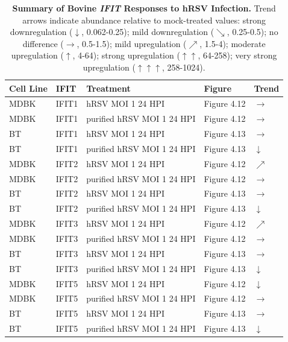 \begin{table}
    \centering
    \begin{tabular}{lllll}
    \hline
		\textbf{Cell Line} & \textbf{IFIT} & \textbf{Treatment} & \textbf{Figure} & \textbf{Trend} \\ \hline
        MDBK & IFIT1 & hRSV MOI 1 24 HPI & Figure 4.12 & \(\rightarrow\) \\ 
        MDBK & IFIT1 & purified hRSV MOI 1 24 HPI & Figure 4.12 & \(\rightarrow\) \\ 
        BT & IFIT1 & hRSV MOI 1 24 HPI & Figure 4.13 & \(\rightarrow\) \\ 
        BT & IFIT1 & purified hRSV MOI 1 24 HPI & Figure 4.13 & \(\downarrow\) \\ 
        MDBK & IFIT2 & hRSV MOI 1 24 HPI & Figure 4.12 & \(\nearrow\) \\ 
        MDBK & IFIT2 & purified hRSV MOI 1 24 HPI & Figure 4.12 & \(\rightarrow\) \\ 
        BT & IFIT2 & hRSV MOI 1 24 HPI & Figure 4.13 & \(\rightarrow\) \\ 
        BT & IFIT2 & purified hRSV MOI 1 24 HPI & Figure 4.13 & \(\downarrow\) \\ 
        MDBK & IFIT3 & hRSV MOI 1 24 HPI & Figure 4.12 & \(\nearrow\) \\ 
        MDBK & IFIT3 & purified hRSV MOI 1 24 HPI & Figure 4.12 & \(\rightarrow\) \\ 
        BT & IFIT3 & hRSV MOI 1 24 HPI & Figure 4.13 & \(\rightarrow\) \\ 
        BT & IFIT3 & purified hRSV MOI 1 24 HPI & Figure 4.13 & \(\downarrow\) \\ 
        MDBK & IFIT5 & hRSV MOI 1 24 HPI & Figure 4.12 & \(\downarrow\) \\ 
        MDBK & IFIT5 & purified hRSV MOI 1 24 HPI & Figure 4.12 & \(\rightarrow\) \\ 
        BT & IFIT5 & hRSV MOI 1 24 HPI & Figure 4.13 & \(\rightarrow\) \\ 
        BT & IFIT5 & purified hRSV MOI 1 24 HPI & Figure 4.13 & \(\downarrow\) \\ \hline
    \end{tabular}
	\caption[Summary of Bovine \textit{IFIT} Responses to hRSV Infection.]{\textbf{Summary of Bovine \textit{IFIT} Responses to hRSV Infection.} Trend arrows indicate abundance relative to mock-treated values: strong downregulation ($\downarrow$, 0.062-0.25); mild downregulation ($\searrow$, 0.25-0.5); no difference ($\rightarrow$, 0.5-1.5); mild upregulation ($\nearrow$, 1.5-4); moderate upregulation ($\uparrow$, 4-64); strong upregulation ($\uparrow\uparrow$, 64-258); very strong upregulation ($\uparrow\uparrow\uparrow$, 258-1024).}
    \label{tab:Summary of Bovine IFIT Responses to hRSV Infection.}
\end{table}

